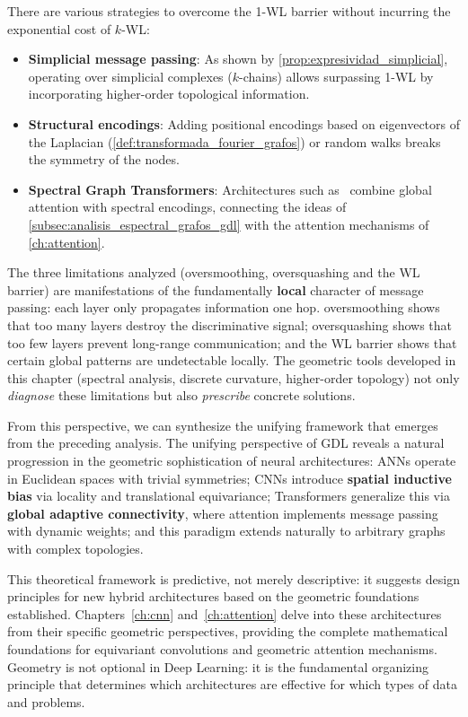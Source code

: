 There are various strategies to overcome the 1-WL barrier without incurring the exponential cost of $k$-WL:
\begin{itemize}
	\item \textbf{Simplicial message passing}: As shown by \autoref{prop:expresividad_simplicial}, operating over simplicial complexes ($k$-chains) allows surpassing 1-WL by incorporating higher-order topological information.
	\item \textbf{Structural encodings}: Adding positional encodings based on eigenvectors of the Laplacian (\autoref{def:transformada_fourier_grafos}) or random walks breaks the symmetry of the nodes.
	\item \textbf{Spectral Graph Transformers}: Architectures such as~\citet{kreuzer2021spectral} combine global attention with spectral encodings, connecting the ideas of \autoref{subsec:analisis_espectral_grafos_gdl} with the attention mechanisms of \autoref{ch:attention}.
\end{itemize}

\medskip

The three limitations analyzed (\gls{oversmoothing}, \gls{oversquashing} and the WL barrier) are manifestations of the fundamentally \textbf{local} character of message passing: each layer only propagates information one hop. \gls{oversmoothing} shows that too many layers destroy the discriminative signal; \gls{oversquashing} shows that too few layers prevent long-range communication; and the WL barrier shows that certain global patterns are undetectable locally. The geometric tools developed in this chapter (spectral analysis, discrete curvature, higher-order topology) not only \textit{diagnose} these limitations but also \textit{prescribe} concrete solutions.

From this perspective, we can synthesize the unifying framework that emerges from the preceding analysis. The unifying perspective of \gls{GDL} reveals a natural progression in the geometric sophistication of neural architectures: \glspl{ANN} operate in Euclidean spaces with trivial symmetries; \glspl{CNN} introduce \textbf{spatial inductive bias} via locality and translational equivariance; \glspl{Transformer} generalize this via \textbf{global adaptive connectivity}, where attention implements message passing with dynamic weights; and this paradigm extends naturally to arbitrary graphs with complex topologies.

This theoretical framework is predictive, not merely descriptive: it suggests design principles for new hybrid architectures based on the geometric foundations established. Chapters~\ref{ch:cnn} and~\ref{ch:attention} delve into these architectures from their specific geometric perspectives, providing the complete mathematical foundations for equivariant convolutions and geometric attention mechanisms. Geometry is not optional in Deep Learning: it is the fundamental organizing principle that determines which architectures are effective for which types of data and problems.
